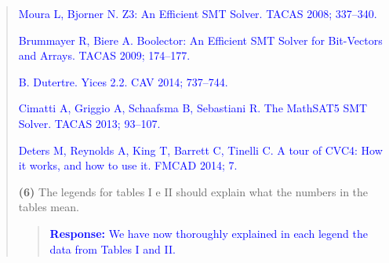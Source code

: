 \documentclass[11pt]{article}
\begin{document}
\begin{quote}
\textcolor{blue}{Moura L, Bjorner N. Z3: An Efficient SMT Solver. TACAS 2008; 337--340.}

\textcolor{blue}{Brummayer R, Biere A. Boolector: An Efficient SMT Solver for Bit-Vectors and Arrays. TACAS 2009; 174--177.}

\textcolor{blue}{B. Dutertre. Yices 2.2. CAV 2014; 737--744.}

\textcolor{blue}{Cimatti A, Griggio A, Schaafsma B, Sebastiani R. The MathSAT5 SMT Solver. TACAS 2013; 93--107.}

\textcolor{blue}{Deters M, Reynolds A, King T, Barrett C, Tinelli C. A tour of CVC4: How it works, and how to use it. FMCAD 2014; 7.}


{\bf(6)} The legends for tables I e II should explain what the numbers in the tables mean.

\begin{quote}
\textcolor{blue}{\textbf{Response:} We have now thoroughly explained in each legend the data from Tables I and II.}
\end{quote}

\end{quote}


\newpage
\end{document}
